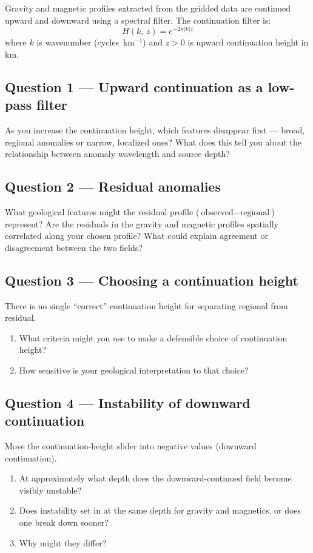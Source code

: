 \documentclass[11pt]{article}
\begin{document}
Gravity and magnetic profiles extracted from the gridded data are continued
upward and downward using a spectral filter.  The continuation filter is:
\[
  H(k,\, z) = e^{-2\pi |k| z}
\]
where $k$ is wavenumber (cycles~km$^{-1}$) and $z > 0$ is upward continuation
height in km.

\subsection*{Question 1 — Upward continuation as a low-pass filter}

As you increase the continuation height, which features disappear first ---
broad, regional anomalies or narrow, localized ones?
What does this tell you about the relationship between anomaly wavelength and
source depth?

\subsection*{Question 2 — Residual anomalies}

What geological features might the residual profile ($\text{observed} - \text{regional}$)
represent?  Are the residuals in the gravity and magnetic profiles spatially
correlated along your chosen profile?  What could explain agreement or
disagreement between the two fields?

\subsection*{Question 3 — Choosing a continuation height}

There is no single ``correct'' continuation height for separating regional from
residual.
\begin{enumerate}[label=\alph*.]
  \item What criteria might you use to make a defensible choice of continuation height?
  \item How sensitive is your geological interpretation to that choice?
\end{enumerate}

\subsection*{Question 4 — Instability of downward continuation}

Move the continuation-height slider into negative values (downward continuation).
\begin{enumerate}[label=\alph*.]
  \item At approximately what depth does the downward-continued field become visibly unstable?
  \item Does instability set in at the same depth for gravity and magnetics, or does one break down sooner?
  \item Why might they differ?
\end{enumerate}
\end{document}

